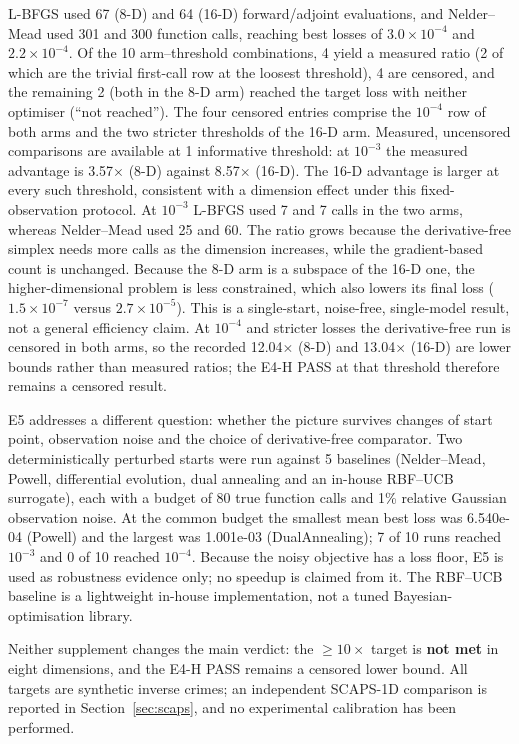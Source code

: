 L-BFGS used 67 (8-D) and 64 (16-D)
forward/adjoint evaluations, and Nelder--Mead used 301 and 300
function calls, reaching best losses of $3.0\times10^{-4}$ and $2.2\times10^{-4}$.
Of the 10 arm--threshold combinations, 4
yield a measured ratio (2 of which are the trivial
first-call row at the loosest threshold), 4 are censored,
and the remaining 2 (both in the 8-D arm) reached the
target loss with neither optimiser (``not reached''). The four censored
entries comprise the $10^{-4}$ row of both arms and the two stricter
thresholds of the 16-D arm.
Measured, uncensored comparisons are available at 1 informative threshold: at $10^{-3}$ the measured advantage is 3.57$\times$ (8-D) against 8.57$\times$ (16-D). The 16-D advantage is larger at every such threshold, consistent with a dimension effect under this fixed-observation protocol. At $10^{-3}$ L-BFGS used 7 and 7 calls in the two arms, whereas Nelder--Mead used 25 and 60. The ratio grows because the derivative-free simplex needs more calls as the dimension increases, while the gradient-based count is unchanged. Because the 8-D arm is a subspace of the 16-D one, the higher-dimensional problem is less constrained, which also lowers its final loss ($1.5\times10^{-7}$ versus $2.7\times10^{-5}$). This is a single-start, noise-free, single-model result, not a general efficiency claim. At $10^{-4}$ and stricter losses the derivative-free run is censored in both arms, so the recorded 12.04$\times$ (8-D) and 13.04$\times$ (16-D) are lower bounds rather than measured ratios; the E4-H PASS at that threshold therefore remains a censored result.

E5 addresses a different question: whether the picture survives changes of
start point, observation noise and the choice of derivative-free comparator.
Two deterministically perturbed starts were run against 5
baselines (Nelder--Mead, Powell, differential evolution, dual annealing and an
in-house RBF--UCB surrogate), each with a budget of 80 true
function calls and 1\% relative Gaussian observation noise. At the
common budget the smallest mean best loss was 6.540e-04 (Powell) and the largest was 1.001e-03 (DualAnnealing);
7 of 10 runs reached $10^{-3}$ and 0 of 10
reached $10^{-4}$. Because the noisy objective has a loss floor, E5 is used as
robustness evidence only; no speedup is claimed from it. The RBF--UCB baseline
is a lightweight in-house implementation, not a tuned Bayesian-optimisation
library.

Neither supplement changes the main verdict: the $\ge10\times$ target is
\textbf{not met} in eight dimensions, and the E4-H PASS remains a censored
lower bound. All targets are synthetic inverse crimes; an independent
SCAPS-1D comparison is reported in Section~\ref{sec:scaps}, and no
experimental calibration has been performed.

